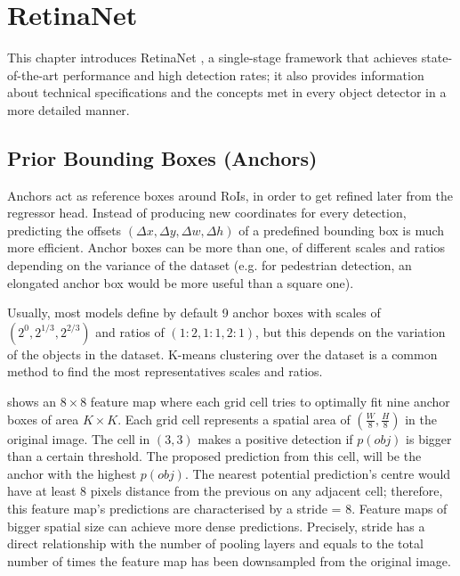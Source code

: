 \chapter{RetinaNet} \label{Chapter:RetinaNet}

This chapter introduces RetinaNet \cite{lin2017focal}, a single-stage framework that achieves state-of-the-art performance and high detection rates; it also provides information about technical specifications and the concepts met in every object detector in a more detailed manner. 

\section{Prior Bounding Boxes (Anchors)}\label{anchor_box}
Anchors act as reference boxes around RoIs, in order to get refined later from the regressor head. Instead of producing new coordinates for every detection, predicting the offsets $(\Delta x, \Delta y, \Delta w, \Delta h)$ of a predefined bounding box is much more efficient. Anchor boxes can be more than one, of different scales and ratios depending on the variance of the dataset (e.g. for pedestrian detection, an elongated anchor box would be more useful than a square one).

Usually, most models define by default 9 anchor boxes with scales of $(2^0, 2^{1/3}, 2^{2/3})$ and ratios of $(1\!:\!2,1\!:\!1,2\!:\!1)$, but this depends on the variation of the objects in the dataset. K-means clustering over the dataset is a common method to find the most representatives scales and ratios.

 shows an $8\times8$ feature map where each grid cell tries to optimally fit nine anchor boxes of area $K\times K$. Each grid cell represents a spatial area of $(\frac{W}{8}, \frac{H}{8})$ in the original image. The cell in $(3,3)$ makes a positive detection if $p(obj)$ is bigger than a certain threshold. The proposed prediction from this cell, will be the anchor with the highest $p(obj)$. The nearest potential prediction's centre would have at least 8 pixels distance from the previous on any adjacent cell; therefore, this feature map's predictions are characterised by a stride = 8. Feature maps of bigger spatial size can achieve more dense predictions. Precisely, stride has a direct relationship with the number of pooling layers and equals to the total number of times the feature map has been downsampled from the original image.

